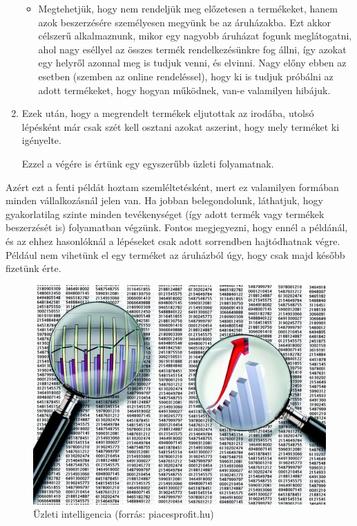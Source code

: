 \begin{enumerate}
\begin{itemize}
\item Megtehetjük, hogy nem rendeljük meg előzetesen a termékeket, hanem azok beszerzésére személyesen megyünk be az áruházakba. Ezt akkor célszerű alkalmaznunk, mikor egy nagyobb áruházat fogunk meglátogatni, ahol nagy eséllyel az összes termék rendelkezésünkre fog állni, így azokat egy helyről azonnal meg is tudjuk venni, és elvinni. Nagy előny ebben az esetben (szemben az online rendeléssel), hogy ki is tudjuk próbálni az adott termékeket, hogy hogyan működnek, van-e valamilyen hibájuk.
\end{itemize}

\item Ezek után, hogy a megrendelt termékek eljutottak az irodába, utolsó lépésként már csak szét kell osztani azokat aszerint, hogy mely terméket ki igényelte.

Ezzel a végére is értünk egy egyszerűbb üzleti folyamatnak.
\end{enumerate}

Azért ezt a fenti példát hoztam szemléltetésként, mert ez valamilyen formában minden vállalkozásnál jelen van. Ha jobban belegondolunk, láthatjuk, hogy gyakorlatilag szinte minden tevékenységet (így adott termék vagy termékek beszerzését is) folyamatban végzünk. Fontos megjegyezni, hogy ennél a példánál, és az ehhez hasonlóknál a lépéseket csak adott sorrendben hajtódhatnak végre. Például nem vihetünk el egy terméket az áruházból úgy, hogy csak majd később fizetünk érte.

\begin{figure}[h]
\centering
\includegraphics[scale=0.5]{images/uzleti_intelligencia.png}
\caption{Üzleti intelligencia (forrás: piacesprofit.hu)}
\label{fig:uzlint}
\end{figure}

